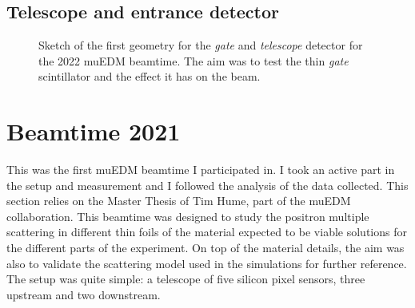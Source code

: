 \begin{refsection}
    \subsection{Telescope and entrance detector}
        \begin{figure}   
            \centering
            \hfill
            \caption[muEDM: sketch if the \textit{telescope}]{Sketch of the first geometry for the \textit{gate} and \textit{telescope} detector for the 2022 muEDM beamtime. The aim was to test the thin \textit{gate} scintillator and the effect it has on the beam.}
            \label{fig:muEDM:entrance:sketches}
        \end{figure}
        
\section{Beamtime 2021}
\label{sec:muEDM:tim}
    This was the first muEDM beamtime I participated in. 
    I took an active part in the setup and measurement and I followed the analysis of the data collected. 
    This section relies on the Master Thesis of Tim Hume, part of the muEDM collaboration.
    This beamtime was designed to study the positron multiple scattering in different thin foils of the material expected to be viable solutions for the different parts of the experiment.
    On top of the material details, the aim was also to validate the scattering model used in the \gf simulations for further reference.
    The setup was quite simple: a telescope of five silicon pixel sensors,  three upstream and two downstream.


\end{refsection}
